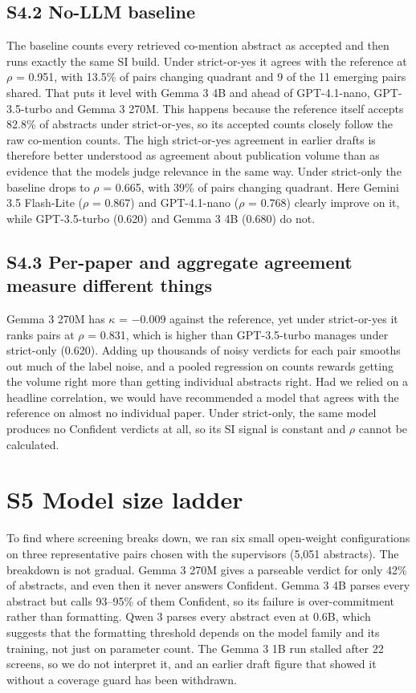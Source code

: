 \documentclass[11pt,a4paper]{article}
\begin{document}
\subsection{S4.2  No-LLM baseline}
The baseline counts every retrieved co-mention abstract as accepted and then runs exactly the same SI build. Under strict-or-yes it agrees with the reference at $\rho$ = 0.951, with 13.5\% of pairs changing quadrant and 9 of the 11 emerging pairs shared. That puts it level with Gemma 3 4B and ahead of GPT-4.1-nano, GPT-3.5-turbo and Gemma 3 270M. This happens because the reference itself accepts 82.8\% of abstracts under strict-or-yes, so its accepted counts closely follow the raw co-mention counts. The high strict-or-yes agreement in earlier drafts is therefore better understood as agreement about publication volume than as evidence that the models judge relevance in the same way. Under strict-only the baseline drops to $\rho$ = 0.665, with 39\% of pairs changing quadrant. Here Gemini 3.5 Flash-Lite ($\rho$ = 0.867) and GPT-4.1-nano ($\rho$ = 0.768) clearly improve on it, while GPT-3.5-turbo (0.620) and Gemma 3 4B (0.680) do not.

\subsection{S4.3  Per-paper and aggregate agreement measure different things}
Gemma 3 270M has $\kappa$ = $-$0.009 against the reference, yet under strict-or-yes it ranks pairs at $\rho$ = 0.831, which is higher than GPT-3.5-turbo manages under strict-only (0.620). Adding up thousands of noisy verdicts for each pair smooths out much of the label noise, and a pooled regression on counts rewards getting the volume right more than getting individual abstracts right. Had we relied on a headline correlation, we would have recommended a model that agrees with the reference on almost no individual paper. Under strict-only, the same model produces no Confident verdicts at all, so its SI signal is constant and $\rho$ cannot be calculated.

\section{S5  Model size ladder}
To find where screening breaks down, we ran six small open-weight configurations on three representative pairs chosen with the supervisors (5,051 abstracts). The breakdown is not gradual. Gemma 3 270M gives a parseable verdict for only 42\% of abstracts, and even then it never answers Confident. Gemma 3 4B parses every abstract but calls 93--95\% of them Confident, so its failure is over-commitment rather than formatting. Qwen 3 parses every abstract even at 0.6B, which suggests that the formatting threshold depends on the model family and its training, not just on parameter count. The Gemma 3 1B run stalled after 22 screens, so we do not interpret it, and an earlier draft figure that showed it without a coverage guard has been withdrawn.
\end{document}
